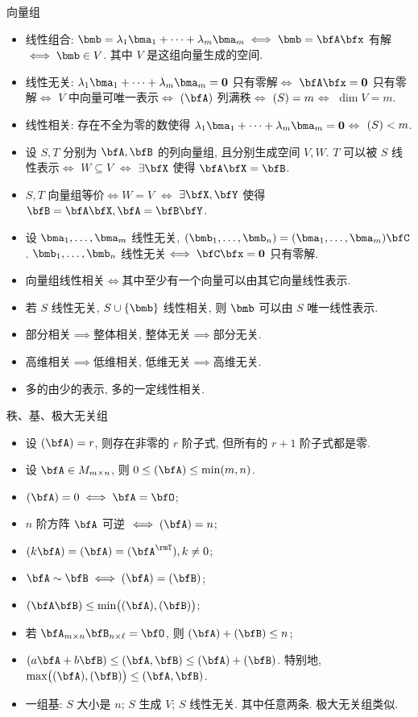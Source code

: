 \documentclass[aspectratio=169,handout]{ctexbeamer}
\let\rank\relax\DeclareMathOperator\rank{\rank}
\begin{document}
\begin{frame}{向量组}
	\onslide<+->
	\begin{itemize}
		\item 线性组合: $\bmb=\lambda_1\bma_1+\cdots+\lambda_m\bma_m\iff \bmb=\bfA\bfx$ 有解 $\iff \bmb\in V$. 其中 $V$ 是这组向量生成的空间.
		\item 线性无关: $\lambda_1\bma_1+\cdots+\lambda_m\bma_m={\bf0}$ 只有零解$\iff$
		$\bfA\bfx={\bf0}$ 只有零解$\iff$
		$V$ 中向量可唯一表示$\iff$
		$\rank(\bfA)$ 列满秩$\iff$
		$\rank(S)=m$$\iff$
		$\dim V=m$.
		\item 线性相关: 存在不全为零的数使得 $\lambda_1\bma_1+\cdots+\lambda_m\bma_m={\bf0}$$\iff$
		$\rank(S)<m$.
		\item 设 $S,T$ 分别为 $\bfA,\bfB$ 的列向量组, 且分别生成空间 $V,W$. 
		$T$ 可以被 $S$ 线性表示$\iff$ $W\subseteq V$
		$\iff$ $\exists\bfX$ 使得 $\bfA\bfX=\bfB$.
		\item $S,T$ 向量组等价$\iff W=V$ $\iff$ $\exists\bfX,\bfY$ 使得 $\bfB=\bfA\bfX,\bfA=\bfB\bfY$. 
		\item 设 $\bma_1,\dots,\bma_m$ 线性无关, $(\bmb_1,\dots,\bmb_n)=(\bma_1,\dots,\bma_m)\bfC$. 
		$\bmb_1,\dots,\bmb_n$ 线性无关$\iff \bfC\bfx={\bf0}$ 只有零解.
		\item 向量组线性相关$\iff$其中至少有一个向量可以由其它向量线性表示.
		\item 若 $S$ 线性无关, $S\cup\{\bmb\}$ 线性相关, 则 $\bmb$ 可以由 $S$ 唯一线性表示.
		\item 部分相关$\implies$整体相关, 整体无关$\implies$部分无关.
		\item 高维相关$\implies$低维相关, 低维无关$\implies$高维无关.
		\item 多的由少的表示, 多的一定线性相关.
	\end{itemize}
\end{frame}


\begin{frame}{秩、基、极大无关组}
	\onslide<+->
	\begin{itemize}
		\item 设 $\rank(\bfA)=r$, 则存在非零的 $r$ 阶子式, 但所有的 $r+1$ 阶子式都是零.
		\item 设 $\bfA\in M_{m\times n}$, 则 $0\le \rank(\bfA)\le \min(m,n)$.
		\item $\rank(\bfA)=0\iff \bfA=\bfO$;
		\item $n$ 阶方阵 $\bfA$ 可逆 $\iff \rank(\bfA)=n$;
		\item $\rank(k\bfA)=\rank(\bfA)=\rank(\bfA^\rmT), k\neq 0$;
		\item $\bfA\sim\bfB\iff \rank(\bfA)=\rank(\bfB)$;
		\item $\rank(\bfA\bfB)\le \min\bigl(\rank(\bfA),\rank(\bfB)\bigr)$;
		\item 若 $\bfA_{m\times n}\bfB_{n\times\ell}=\bfO$, 则 $\rank(\bfA)+\rank(\bfB)\le n$;
		\item $\rank(a\bfA+b\bfB)\le \rank(\bfA,\bfB)\le \rank(\bfA)+\rank(\bfB)$.
		特别地, $\max\bigl(\rank(\bfA),\rank(\bfB)\bigr)\le \rank(\bfA,\bfB)$.
		\item 一组基: $S$ 大小是 $n$; $S$ 生成 $V$; $S$ 线性无关. 其中任意两条. 极大无关组类似.
	\end{itemize}
\end{frame}
\end{document}
